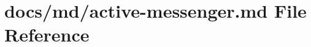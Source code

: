 \hypertarget{active-messenger_8md}{}\section{docs/md/active-\/messenger.md File Reference}
\label{active-messenger_8md}
